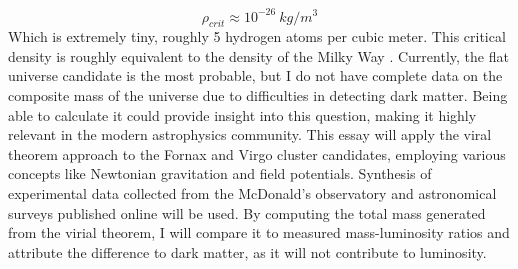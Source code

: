 \documentclass[12pt]{article}
\begin{document}
\begin{equation}\label{eq:rhocrit2}
    \rho_{crit} \approx 10^{-26}  \: kg/m^3
\end{equation}
Which is extremely tiny, roughly 5 hydrogen atoms per cubic meter. This critical density is roughly equivalent to the density of the Milky Way \cite{Impey2023}. Currently, the flat universe candidate is the most probable, but I do not have complete data on the composite mass of the universe due to difficulties in detecting dark matter. Being able to calculate it could provide insight into this question, making it highly relevant in the modern astrophysics community. This essay will apply the viral theorem approach to the Fornax and Virgo cluster candidates, employing various concepts like Newtonian gravitation and field potentials. Synthesis of experimental data collected from the McDonald's observatory and astronomical surveys published online will be used. By computing the total mass generated from the virial theorem, I will compare it to measured mass-luminosity ratios and attribute the difference to dark matter, as it will not contribute to luminosity.
\end{document}
